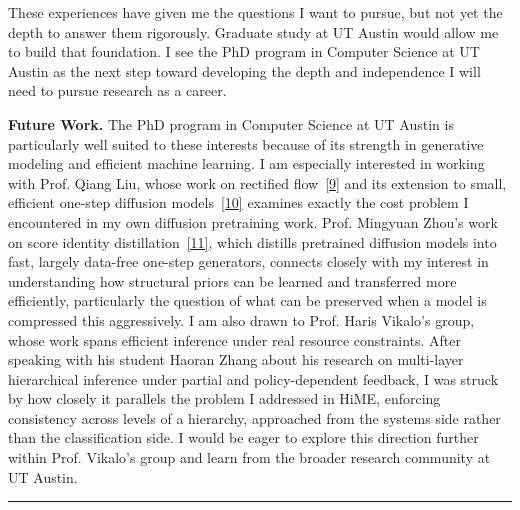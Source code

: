 \documentclass[12pt]{article}
\begin{document}
\vspace{8pt}

These experiences have given me the questions I want to pursue, but not yet the depth to answer them rigorously. Graduate study at UT Austin would allow me to build that foundation. I see the PhD program in Computer Science at UT Austin as the next step toward developing the depth and independence I will need to pursue research as a career.

\vspace{8pt}

\textbf{Future Work. }The PhD program in Computer Science at UT Austin is particularly well suited to these interests because of its strength in generative modeling and efficient machine learning. I am especially interested in working with Prof. Qiang Liu, whose work on rectified flow~\hyperref[ref9]{[9]} and its extension to small, efficient one-step diffusion models~\hyperref[ref10]{[10]} examines exactly the cost problem I encountered in my own diffusion pretraining work. Prof. Mingyuan Zhou's work on score identity distillation~\hyperref[ref11]{[11]}, which distills pretrained diffusion models into fast, largely data-free one-step generators, connects closely with my interest in understanding how structural priors can be learned and transferred more efficiently, particularly the question of what can be preserved when a model is compressed this aggressively. I am also drawn to Prof. Haris Vikalo's group, whose work spans efficient inference under real resource constraints. After speaking with his student Haoran Zhang about his research on multi-layer hierarchical inference under partial and policy-dependent feedback, I was struck by how closely it parallels the problem I addressed in HiME, enforcing consistency across levels of a hierarchy, approached from the systems side rather than the classification side. I would be eager to explore this direction further within Prof. Vikalo's group and learn from the broader research community at UT Austin.

\vspace{4pt}
\hrule
\vspace{4pt}
\end{document}
